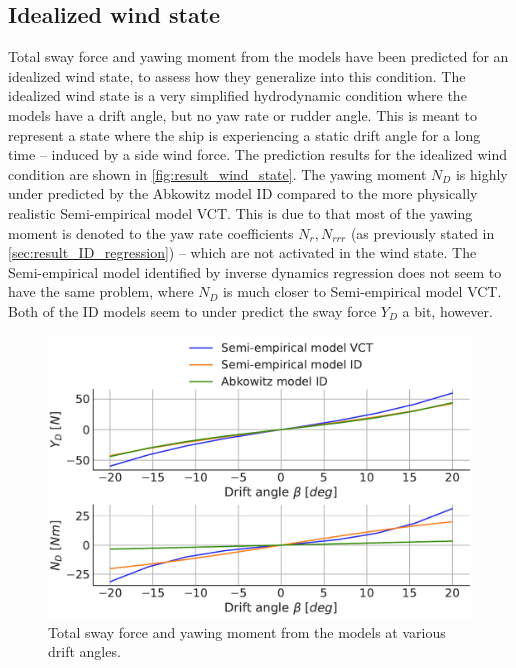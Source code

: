 \subsection{Idealized wind state}
Total sway force and yawing moment from the models have been predicted for an idealized wind state, to assess how they generalize into this condition.
The idealized wind state is a very simplified hydrodynamic condition where the models have a drift angle, but no yaw rate or rudder angle. This is meant to represent a state where the ship is experiencing a static drift angle for a long time -- induced by a side wind force.
The prediction results for the idealized wind condition are shown in \autoref{fig:result_wind_state}. The yawing moment $N_D$ is highly under predicted by the Abkowitz model ID compared to the more physically realistic Semi-empirical model VCT. This is due to that most of the yawing moment is denoted to the yaw rate coefficients $N_r,N_{rrr}$ (as previously stated in \autoref{sec:result_ID_regression}) -- which are not activated in the wind state. The Semi-empirical model identified by inverse dynamics regression does not seem to have the same problem, where $N_D$ is much closer to Semi-empirical model VCT. Both of the ID models seem to under predict the sway force $Y_D$ a bit, however.
\label{sec:wind_state}
\begin{figure}[h!]
    \includegraphics[width=\columnwidth]{figures/result_wind_state.forces.pdf}
    \caption{Total sway force and yawing moment from the models at various drift angles.}
    \label{fig:result_wind_state}
\end{figure}